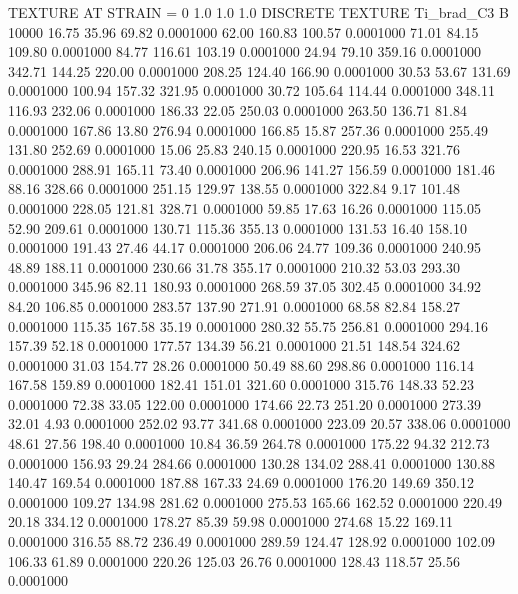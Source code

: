 TEXTURE AT STRAIN = 0
1.0   1.0   1.0
DISCRETE TEXTURE Ti_brad_C3
B 10000
  16.75   35.96   69.82   0.0001000
  62.00  160.83  100.57   0.0001000
  71.01   84.15  109.80   0.0001000
  84.77  116.61  103.19   0.0001000
  24.94   79.10  359.16   0.0001000
 342.71  144.25  220.00   0.0001000
 208.25  124.40  166.90   0.0001000
  30.53   53.67  131.69   0.0001000
 100.94  157.32  321.95   0.0001000
  30.72  105.64  114.44   0.0001000
 348.11  116.93  232.06   0.0001000
 186.33   22.05  250.03   0.0001000
 263.50  136.71   81.84   0.0001000
 167.86   13.80  276.94   0.0001000
 166.85   15.87  257.36   0.0001000
 255.49  131.80  252.69   0.0001000
  15.06   25.83  240.15   0.0001000
 220.95   16.53  321.76   0.0001000
 288.91  165.11   73.40   0.0001000
 206.96  141.27  156.59   0.0001000
 181.46   88.16  328.66   0.0001000
 251.15  129.97  138.55   0.0001000
 322.84    9.17  101.48   0.0001000
 228.05  121.81  328.71   0.0001000
  59.85   17.63   16.26   0.0001000
 115.05   52.90  209.61   0.0001000
 130.71  115.36  355.13   0.0001000
 131.53   16.40  158.10   0.0001000
 191.43   27.46   44.17   0.0001000
 206.06   24.77  109.36   0.0001000
 240.95   48.89  188.11   0.0001000
 230.66   31.78  355.17   0.0001000
 210.32   53.03  293.30   0.0001000
 345.96   82.11  180.93   0.0001000
 268.59   37.05  302.45   0.0001000
  34.92   84.20  106.85   0.0001000
 283.57  137.90  271.91   0.0001000
  68.58   82.84  158.27   0.0001000
 115.35  167.58   35.19   0.0001000
 280.32   55.75  256.81   0.0001000
 294.16  157.39   52.18   0.0001000
 177.57  134.39   56.21   0.0001000
  21.51  148.54  324.62   0.0001000
  31.03  154.77   28.26   0.0001000
  50.49   88.60  298.86   0.0001000
 116.14  167.58  159.89   0.0001000
 182.41  151.01  321.60   0.0001000
 315.76  148.33   52.23   0.0001000
  72.38   33.05  122.00   0.0001000
 174.66   22.73  251.20   0.0001000
 273.39   32.01    4.93   0.0001000
 252.02   93.77  341.68   0.0001000
 223.09   20.57  338.06   0.0001000
  48.61   27.56  198.40   0.0001000
  10.84   36.59  264.78   0.0001000
 175.22   94.32  212.73   0.0001000
 156.93   29.24  284.66   0.0001000
 130.28  134.02  288.41   0.0001000
 130.88  140.47  169.54   0.0001000
 187.88  167.33   24.69   0.0001000
 176.20  149.69  350.12   0.0001000
 109.27  134.98  281.62   0.0001000
 275.53  165.66  162.52   0.0001000
 220.49   20.18  334.12   0.0001000
 178.27   85.39   59.98   0.0001000
 274.68   15.22  169.11   0.0001000
 316.55   88.72  236.49   0.0001000
 289.59  124.47  128.92   0.0001000
 102.09  106.33   61.89   0.0001000
 220.26  125.03   26.76   0.0001000
 128.43  118.57   25.56   0.0001000
